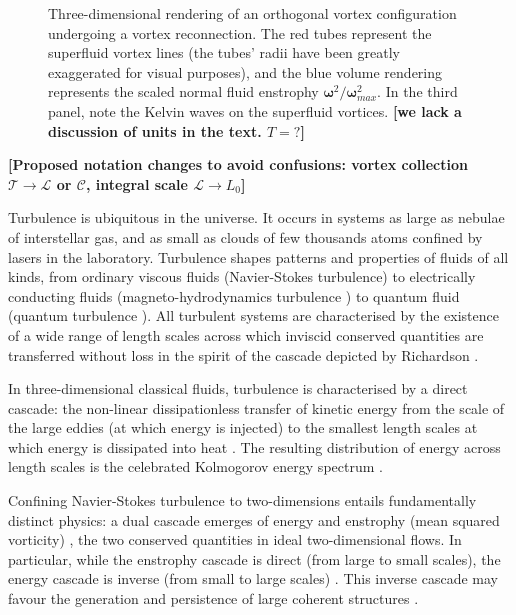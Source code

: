 \documentclass[%
 reprint,
 amsmath,amssymb,
 aps,
 prl,
]{revtex4-2}
\newcommand{\bom}{\boldsymbol{\omega}}
\def\red#1{\textcolor{red}{#1}}
\newcommand*{\NOTE}[1]{\textbf{\color{red}[#1]}}
\begin{document}
\begin{figure}
\begin{subfigure}[b]{0.24\textwidth}
	\end{subfigure} \hfill
	\caption{Three-dimensional rendering of an orthogonal vortex configuration 
undergoing a vortex reconnection. The red tubes represent
the superfluid vortex
lines (the tubes' radii have been greatly exaggerated for visual purposes), 
and the blue volume rendering represents the scaled normal fluid enstrophy 
$\bom^2/\bom^2_{max}$. In the third panel, note the Kelvin waves on the superfluid vortices. \NOTE{we lack a discussion of units in the text. $T=?$}}
    \label{fig:visualisation}
\end{figure}


\NOTE{Proposed notation changes to avoid confusions: vortex collection $\mathcal{T}\to\mathcal{L}$ or $\mathcal{C}$, integral scale $\mathcal{L}\to L_0$}

Turbulence is ubiquitous in the universe.  It occurs in systems
as large as nebulae of interstellar gas, and as small as clouds of
few thousands atoms confined by lasers in the laboratory.
Turbulence shapes patterns and properties of fluids of all
kinds, from ordinary
 viscous fluids (Navier-Stokes turbulence\cite{frisch1995}) 
to electrically conducting fluids (magneto-hydrodynamics turbulence
\cite{canuto-dalsgaard-1998}) to quantum fluid
(quantum turbulence \cite{barenghi-etal-2023,
Barenghi_Skrbek_Sreenivasan_2023}).
All turbulent systems are characterised by 
the existence of a wide range 
of length scales across which inviscid conserved quantities 
are transferred without loss in the spirit of the cascade 
depicted by Richardson \cite{richardson1922weather}. 

In three-dimensional classical fluids, turbulence 
is characterised by a direct cascade: the
non-linear dissipationless transfer of kinetic energy from the scale of
the large eddies (at which energy is injected) to the smallest length scales
at which energy is dissipated into heat
\cite{richardson1922weather,kolmogorov-1941}. 
The resulting distribution of energy across length scales is
the celebrated Kolmogorov energy spectrum 
\cite{kolmogorov-1941,frisch1995}. 

Confining Navier-Stokes turbulence to two-dimensions entails 
fundamentally distinct physics: a dual cascade emerges of energy and enstrophy 
(mean squared vorticity) \cite{kraichnan-1967,boffetta-ecke-2012}, 
the two conserved quantities in ideal two-dimensional flows.
In particular, while the enstrophy cascade is direct (from large to small
scales), the energy cascade is inverse (from small to large scales)
\cite{boffetta-musacchio-2010}. This inverse cascade 
may favour the generation and persistence of large coherent 
structures \cite{laurie-etal-2014}. 
\end{document}
